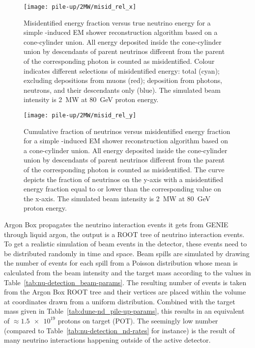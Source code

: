 \begin{figure}[htb]
	\centering
	\texttt{[image: pile-up/2MW/misid\_rel\_x]}
	\caption{Misidentified energy fraction versus true neutrino energy for a simple \Pgpz-induced EM shower reconstruction algorithm based on a cone-cylinder union.
		All energy deposited inside the cone-cylinder union by descendants of parent neutrinos different from the parent of the corresponding \Pgpz photon is counted as misidentified.
		Colour indicates different selections of misidentified energy: total (cyan); excluding depositions from muons (red); deposition from photons, neutrons, and their descendants only (blue).
		The simulated beam intensity is \SI{2}{\mega\watt} at \SI{80}{\giga\electronvolt} proton energy.}
	\label{fig:dune-nd_2MW_misid-rel-x}
\end{figure}

\begin{figure}[htb]
	\centering
	\texttt{[image: pile-up/2MW/misid\_rel\_y]}
	\caption{Cumulative fraction of neutrinos versus misidentified energy fraction for a simple \Pgpz-induced EM shower reconstruction algorithm based on a cone-cylinder union.
		All energy deposited inside the cone-cylinder union by descendants of parent neutrinos different from the parent of the corresponding \Pgpz photon is counted as misidentified.
		The curve depicts the fraction of neutrinos on the y-axis with a misidentified energy fraction equal to or lower than the corresponding value on the x-axis.
		The simulated beam intensity is \SI{2}{\mega\watt} at \SI{80}{\giga\electronvolt} proton energy.}
	\label{fig:dune-nd_2MW_misid-rel-y}
\end{figure}

Argon Box propagates the neutrino interaction events it gets from GENIE through liquid argon, the output is a ROOT tree of neutrino interaction events.
To get a realistic simulation of beam events in the detector, these events need to be distributed randomly in time and space.
Beam spills are simulated by drawing the number of events for each spill from a Poisson distribution whose mean is calculated from the beam intensity and the target mass according to the values in Table~\ref{tab:nu-detection_beam-params}.
The resulting number of events is taken from the Argon Box ROOT tree and their vertices are placed within the \lar{} volume at coordinates drawn from a uniform distribution.
Combined with the target mass given in Table~\ref{tab:dune-nd_pile-up-params}, this results in an equivalent of $\approx \num{1.5e19}$ protons on target (POT).
The seemingly low number (compared to Table~\ref{tab:nu-detection_nd-rates} for instance) is the result of many neutrino interactions happening outside of the active detector.

